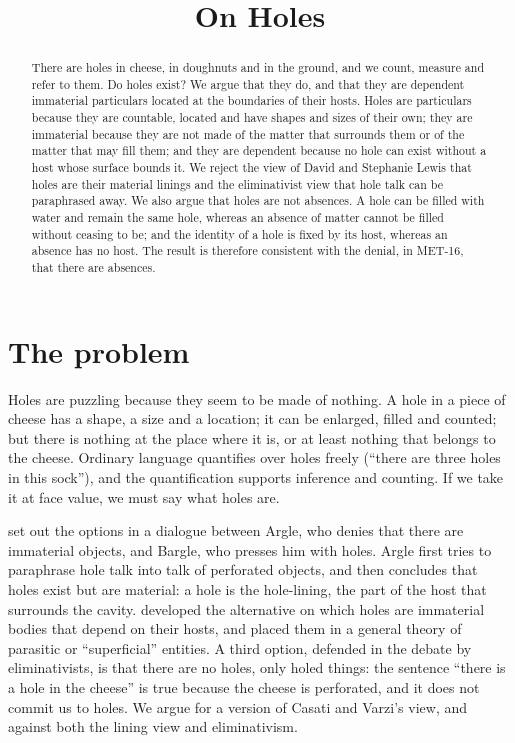 \documentclass{situationist-preprint}
\title{On Holes}
\begin{document}
\maketitle

\begin{abstract}
There are holes in cheese, in doughnuts and in the ground, and we count, measure and refer to them. Do holes exist? We argue that they do, and that they are dependent immaterial particulars located at the boundaries of their hosts. Holes are particulars because they are countable, located and have shapes and sizes of their own; they are immaterial because they are not made of the matter that surrounds them or of the matter that may fill them; and they are dependent because no hole can exist without a host whose surface bounds it. We reject the view of David and Stephanie Lewis that holes are their material linings and the eliminativist view that hole talk can be paraphrased away. We also argue that holes are not absences. A hole can be filled with water and remain the same hole, whereas an absence of matter cannot be filled without ceasing to be; and the identity of a hole is fixed by its host, whereas an absence has no host. The result is therefore consistent with the denial, in MET-16, that there are absences.
\end{abstract}

\section{The problem}

Holes are puzzling because they seem to be made of nothing. A hole in a piece of cheese has a shape, a size and a location; it can be enlarged, filled and counted; but there is nothing at the place where it is, or at least nothing that belongs to the cheese. Ordinary language quantifies over holes freely (\enquote{there are three holes in this sock}), and the quantification supports inference and counting. If we take it at face value, we must say what holes are.

\citet{LewisLewis1970} set out the options in a dialogue between Argle, who denies that there are immaterial objects, and Bargle, who presses him with holes. Argle first tries to paraphrase hole talk into talk of perforated objects, and then concludes that holes exist but are material: a hole is the hole-lining, the part of the host that surrounds the cavity. \citet{CasatiVarzi1994} developed the alternative on which holes are immaterial bodies that depend on their hosts, and placed them in a general theory of parasitic or \enquote{superficial} entities. A third option, defended in the debate by eliminativists, is that there are no holes, only holed things: the sentence \enquote{there is a hole in the cheese} is true because the cheese is perforated, and it does not commit us to holes. We argue for a version of Casati and Varzi's view, and against both the lining view and eliminativism.
\end{document}
